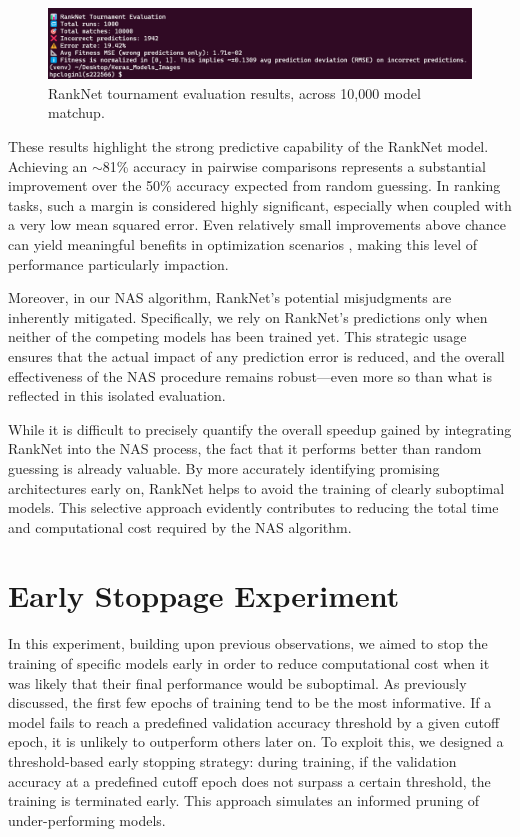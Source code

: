 \begin{figure}[ht]
    \centering
    \includegraphics[width=1.05\linewidth]{Pictures/RankNetComparison2.png}
    \caption{RankNet tournament evaluation results, across 10,000 model matchup.}
    \label{fig:RankNetComparison}
\end{figure}


These results highlight the strong predictive capability of the RankNet model. Achieving an $\sim$81\% accuracy in pairwise comparisons represents a substantial improvement over the 50\% accuracy expected from random guessing. In ranking tasks, such a margin is considered highly significant, especially when coupled with a very low mean squared error. Even relatively small improvements above chance can yield meaningful benefits in optimization scenarios \cite{freund1999large}, making this level of performance particularly impaction.

Moreover, in our NAS algorithm, RankNet's potential misjudgments are inherently mitigated. Specifically, we rely on RankNet's predictions only when neither of the competing models has been trained yet. This strategic usage ensures that the actual impact of any prediction error is reduced, and the overall effectiveness of the NAS procedure remains robust—even more so than what is reflected in this isolated evaluation.

While it is difficult to precisely quantify the overall speedup gained by integrating RankNet into the NAS process, the fact that it performs better than random guessing is already valuable. By more accurately identifying promising architectures early on, RankNet helps to avoid the training of clearly suboptimal models. This selective approach evidently contributes to reducing the total time and computational cost required by the NAS algorithm.


\section{Early Stoppage Experiment}

In this experiment, building upon previous observations, we aimed to stop the training of specific models early in order to reduce computational cost when it was likely that their final performance would be suboptimal. As previously discussed, the first few epochs of training tend to be the most informative. If a model fails to reach a predefined validation accuracy threshold by a given cutoff epoch, it is unlikely to outperform others later on. To exploit this, we designed a threshold-based early stopping strategy: during training, if the validation accuracy at a predefined cutoff epoch does not surpass a certain threshold, the training is terminated early. This approach simulates an informed pruning of under-performing models.

